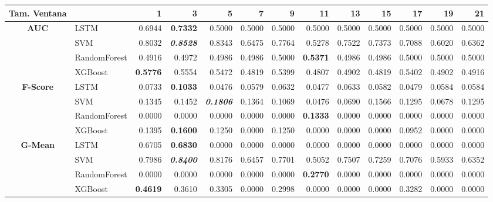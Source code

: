 \begin{table}[H]
	\centering
	\begin{adjustbox}{max width=12cm}
		\begin{tabular}{|c|l|r|r|r|r|r|r|r|r|r|r|r|}
			\hline
			\textbf{Tam. Ventana} &         &      1  &      3  &      5  &      7  &      9  &      11 &      13 &      15 &      17 &      19 &      21 \\
			\hline
			\textbf{AUC} &  LSTM &  0.6944 & \textbf{  0.7332 } &  0.5000 &  0.5000 &  0.5000 &  0.5000 &  0.5000 &  0.5000 &  0.5000 &  0.5000 &  0.5000 \\
			&  SVM &  0.8032 & \textit{ \textbf{  0.8528 } } &  0.8343 &  0.6475 &  0.7764 &  0.5278 &  0.7522 &  0.7373 &  0.7088 &  0.6020 &  0.6362 \\
			&  RandomForest &  0.4916 &  0.4972 &  0.4986 &  0.4986 &  0.5000 & \textbf{  0.5371 } &  0.4986 &  0.4986 &  0.5000 &  0.5000 &  0.5000 \\
			&  XGBoost & \textbf{  0.5776 } &  0.5554 &  0.5472 &  0.4819 &  0.5399 &  0.4807 &  0.4902 &  0.4819 &  0.5402 &  0.4902 &  0.4916 \\
			\hline
			\textbf{F-Score} &  LSTM &  0.0733 & \textbf{  0.1033 } &  0.0476 &  0.0579 &  0.0632 &  0.0477 &  0.0633 &  0.0582 &  0.0479 &  0.0584 &  0.0584 \\
			&  SVM &  0.1345 &  0.1452 & \textit{ \textbf{  0.1806 } } &  0.1364 &  0.1069 &  0.0476 &  0.0690 &  0.1566 &  0.1295 &  0.0678 &  0.1295 \\
			&  RandomForest &  0.0000 &  0.0000 &  0.0000 &  0.0000 &  0.0000 & \textbf{  0.1333 } &  0.0000 &  0.0000 &  0.0000 &  0.0000 &  0.0000 \\
			&  XGBoost &  0.1395 & \textbf{  0.1600 } &  0.1250 &  0.0000 &  0.1250 &  0.0000 &  0.0000 &  0.0000 &  0.0952 &  0.0000 &  0.0000 \\
			\hline
			\textbf{G-Mean} &  LSTM &  0.6705 & \textbf{  0.6830 } &  0.0000 &  0.0000 &  0.0000 &  0.0000 &  0.0000 &  0.0000 &  0.0000 &  0.0000 &  0.0000 \\
			&  SVM &  0.7986 & \textit{ \textbf{  0.8400 } } &  0.8176 &  0.6457 &  0.7701 &  0.5052 &  0.7507 &  0.7259 &  0.7076 &  0.5933 &  0.6352 \\
			&  RandomForest &  0.0000 &  0.0000 &  0.0000 &  0.0000 &  0.0000 & \textbf{  0.2770 } &  0.0000 &  0.0000 &  0.0000 &  0.0000 &  0.0000 \\
			&  XGBoost & \textbf{  0.4619 } &  0.3610 &  0.3305 &  0.0000 &  0.2998 &  0.0000 &  0.0000 &  0.0000 &  0.3282 &  0.0000 &  0.0000 \\

\end{tabular}
\end{adjustbox}
\end{table}
